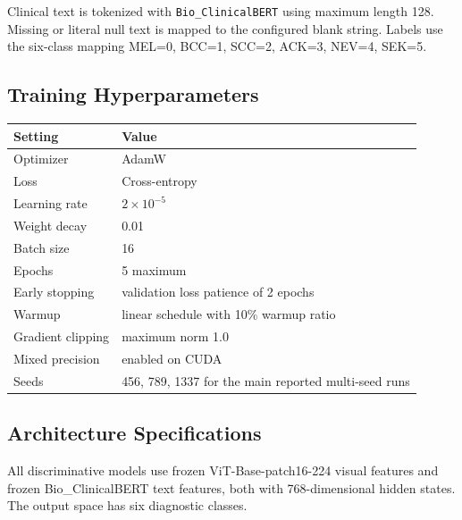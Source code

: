 \documentclass[10pt]{article}
\begin{document}
Clinical text is tokenized with \texttt{Bio\_ClinicalBERT} using maximum
length 128. Missing or literal null text is mapped to the configured blank
string. Labels use the six-class mapping MEL=0, BCC=1, SCC=2, ACK=3,
NEV=4, SEK=5.

\subsection*{Training Hyperparameters}

\begin{tabular}{ll}
\toprule
\textbf{Setting} & \textbf{Value} \\
\midrule
Optimizer & AdamW \\
Loss & Cross-entropy \\
Learning rate & $2\times10^{-5}$ \\
Weight decay & 0.01 \\
Batch size & 16 \\
Epochs & 5 maximum \\
Early stopping & validation loss patience of 2 epochs \\
Warmup & linear schedule with 10\% warmup ratio \\
Gradient clipping & maximum norm 1.0 \\
Mixed precision & enabled on CUDA \\
Seeds & 456, 789, 1337 for the main reported multi-seed runs \\
\bottomrule
\end{tabular}

\subsection*{Architecture Specifications}

All discriminative models use frozen ViT-Base-patch16-224 visual features
and frozen Bio\_ClinicalBERT text features, both with 768-dimensional hidden
states. The output space has six diagnostic classes.
\end{document}

